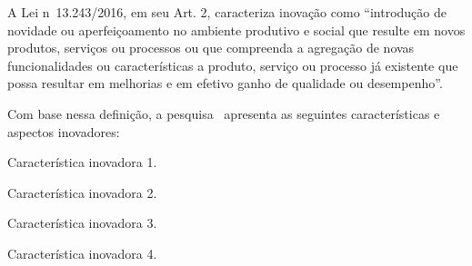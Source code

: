 
A Lei n\ele\ 13.243/2016, em seu Art. 2\ele, caracteriza inovação como ``introdução de novidade ou aperfeiçoamento no ambiente produtivo e social que resulte em novos produtos, serviços ou processos ou que compreenda a agregação de novas funcionalidades ou características a produto, serviço ou processo já existente que possa resultar em melhorias e em efetivo ganho de qualidade ou desempenho''.

Com base nessa definição, a pesquisa \projpesq\ apresenta as seguintes características e aspectos inovadores:

\begin{alineas}
    \item Característica inovadora 1.

    \item Característica inovadora 2.

    \item Característica inovadora 3.

    \item Característica inovadora 4.
\end{alineas}
